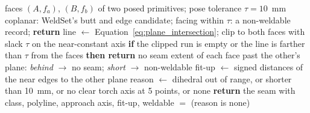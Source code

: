 \begin{algorithm}[htbp]
\caption{Planar seam of two registered faces}
\label{alg:planar_seam}
\begin{algorithmic}[1]
\REQUIRE faces $(A,f_a)$, $(B,f_b)$ of two posed primitives; pose tolerance $\tau=10$~mm
  \STATE coplanar: WeldSet's butt and edge candidate; facing within $\tau$: a non-weldable record; \textbf{return}
\ENDIF
\STATE line $\gets$ Equation~\ref{eq:plane_intersection}; clip to both faces with slack $\tau$ on the near-constant axis
\STATE \textbf{if} the clipped run is empty or the line is farther than $\tau$ from the faces \textbf{then return} no seam
\STATE extent of each face past the other's plane: \emph{behind} $\to$ no seam; \emph{short} $\to$ non-weldable
\STATE fit-up $\gets$ signed distances of the near edges to the other plane
\STATE reason $\gets$ dihedral out of range, or shorter than 10~mm, or no clear torch axis at 5 points, or none
\STATE \textbf{return} the seam with class, polyline, approach axis, fit-up, weldable $=$ (reason is none)
\end{algorithmic}
\end{algorithm}

